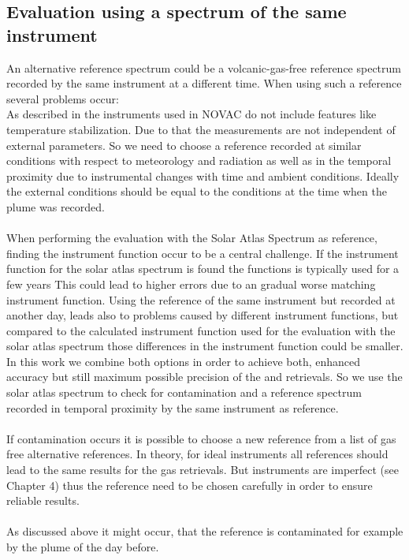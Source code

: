 %
\subsection*{Evaluation using a spectrum of the same instrument}
An alternative reference spectrum could be a volcanic-gas-free reference
spectrum recorded by the same instrument at a different time. When using such a reference several problems occur:\\
As described in  the instruments used in NOVAC do not include features like temperature stabilization. Due to that the measurements are not independent of external parameters. 
So we need to choose a reference recorded at similar conditions with respect to meteorology and	radiation as well as in the temporal proximity due to instrumental changes with time and ambient conditions. Ideally the external conditions should be equal to the conditions at the time when the plume was recorded.\\
\\
%
When performing the evaluation with the Solar Atlas Spectrum as reference, finding the instrument function occur to be a central challenge. If the instrument function for the solar atlas spectrum is found the functions is typically used for a few years This could lead to higher errors due to an gradual worse matching instrument function.
Using the reference of the same instrument but recorded at another day, leads also to problems caused by different instrument functions, but compared to the calculated instrument function used for the evaluation with the solar atlas spectrum those differences in the instrument function could be smaller.
\\
In this work we combine both options in order to
achieve both, enhanced accuracy but still maximum possible precision of
the  and  retrievals. So we use the solar atlas spectrum to check for 
contamination and a reference spectrum recorded in temporal proximity by the same instrument as reference.\\
\\
If contamination occurs it is possible to choose a new reference from a list of gas free alternative references. In theory, for ideal instruments all references should lead to
	the same results for the gas retrievals. But instruments are imperfect (see Chapter
	4) thus the reference need to be chosen carefully in order to ensure reliable results.\\
%
\\
As discussed above it might occur, that the reference is contaminated for example by the plume of the day before.
